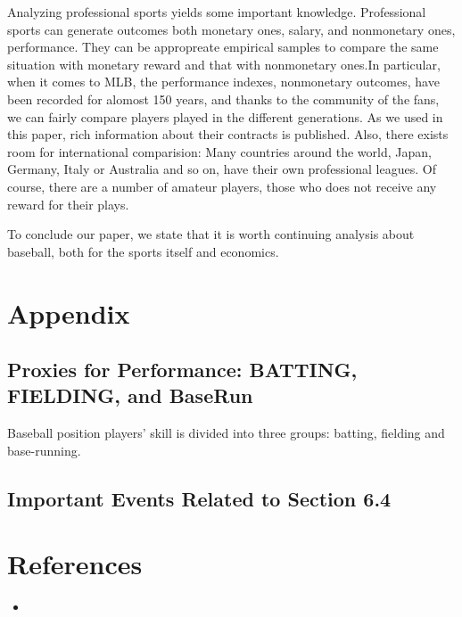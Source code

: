 \documentclass[dvipdfmx, 12pt]{article}
\begin{document}
Analyzing professional sports yields some important knowledge. Professional sports can generate outcomes both monetary ones, salary, and nonmonetary ones, performance. They can be appropreate empirical samples to compare the same situation with monetary reward and that with nonmonetary ones.In particular, when it comes to MLB, the performance indexes, nonmonetary outcomes, have been recorded for alomost 150 years, and thanks to the community of the fans, we can fairly compare players played in the different generations. As we used in this paper, rich information about their contracts is published. Also, there exists room for international comparision: Many countries around the world, Japan, Germany, Italy or Australia and so on, have their own professional leagues. Of course, there are a number of amateur players, those who does not receive any reward for their plays.

To conclude our paper, we state that it is worth continuing analysis about baseball, both for the sports itself and economics.


\section{Appendix}

\subsection{Proxies for Performance: BATTING, FIELDING, and BaseRun}
\small

Baseball position players' skill is divided into three groups: batting, fielding and base-running.



\subsection{Important Events Related to Section 6.4}


\section{References}
\small
\begin{itemize}
  \item
\end{itemize}
\end{document}
